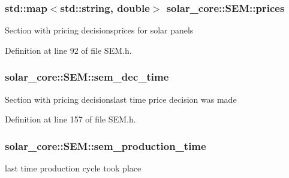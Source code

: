 \hypertarget{classsolar__core_1_1_s_e_m_a69aaf0be4ed0edf8a52e48f97a0de5f6}{}
\subsubsection[{prices}]{\setlength{\rightskip}{0pt plus 5cm}std\+::map$<$std\+::string, double$>$ solar\+\_\+core\+::\+S\+E\+M\+::prices}\label{classsolar__core_1_1_s_e_m_a69aaf0be4ed0edf8a52e48f97a0de5f6}
Section with pricing decisionsprices for solar panels 

Definition at line 92 of file S\+E\+M.\+h.

\hypertarget{classsolar__core_1_1_s_e_m_a37a50821d1926b9028e70431fb383a7a}{}
\subsubsection[{sem\+\_\+dec\+\_\+time}]{ solar\+\_\+core\+::\+S\+E\+M\+::sem\+\_\+dec\+\_\+time\hspace{0.3cm}{\ttfamily [protected]}}\label{classsolar__core_1_1_s_e_m_a37a50821d1926b9028e70431fb383a7a}
Section with pricing decisionslast time price decision was made 

Definition at line 157 of file S\+E\+M.\+h.

\hypertarget{classsolar__core_1_1_s_e_m_aa4a21386cf6942df0b5e501a2588aaad}{}
\subsubsection[{sem\+\_\+production\+\_\+time}]{ solar\+\_\+core\+::\+S\+E\+M\+::sem\+\_\+production\+\_\+time\hspace{0.3cm}{\ttfamily [protected]}}\label{classsolar__core_1_1_s_e_m_aa4a21386cf6942df0b5e501a2588aaad}
last time production cycle took place 

